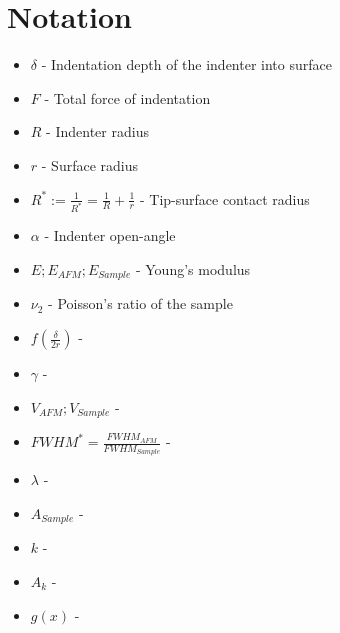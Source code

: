 \section{Notation}

\begin{itemize}
    \item $\delta$ - Indentation depth of the indenter into surface
    \item $F$ - Total force of indentation 
    \item $R$ - Indenter radius 
    \item $r$ - Surface radius 
    \item $R^* := \frac{1}{R^*} = \frac{1}{R} +\frac{1}{r}$ - Tip-surface contact radius 
    \item $\alpha$ - Indenter open-angle 
    \item $E ; E_{AFM} ; E_{Sample}$ - Young’s modulus 
    \item $\nu_2$ - Poisson’s ratio of the sample 
    \item $f(\frac{\delta}{2r})$ - 
    \item $\gamma$ - 
    \item $V_{AFM} ; V_{Sample}$ - 
    \item $FWHM^* = \frac{FWHM_{AFM}}{FWHM_{Sample}}$ - 
    \item $\lambda$ - 
    \item $A_{Sample}$ - 
    \item $k$ - 
    \item $A_k$ - 
    \item $g(x)$ -
\end{itemize}

\newpage



